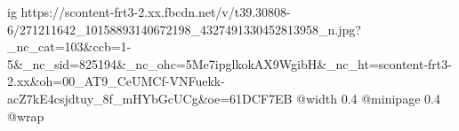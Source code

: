 
 
 
 
 

\ifcmt
  ig https://scontent-frt3-2.xx.fbcdn.net/v/t39.30808-6/271211642_10158893140672198_4327491330452813958_n.jpg?_nc_cat=103&ccb=1-5&_nc_sid=825194&_nc_ohc=5Me7ipglkokAX9WgibH&_nc_ht=scontent-frt3-2.xx&oh=00_AT9_CeUMCf-VNFuekk-acZ7kE4csjdtuy_8f_mHYbGcUCg&oe=61DCF7EB
  @width 0.4
  @minipage 0.4
  @wrap \parpic[r]
\fi
